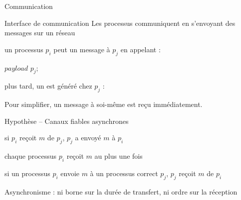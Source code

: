 
\begingroup

\begin{frame}{Communication}

  \vspace{-2mm}
  \begin{block}{Interface de communication}
    Les processus communiquent en s'envoyant des messages sur un réseau
    \begin{description}[Réception :]
      \item[Émission :]  un processus $p_i$ peut  un message à $p_j$ en appelant :
      \begin{algorithm}[H]
        \Send $\mathit{payload}$ \To $p_j$; 
      \end{algorithm}
      \item[Réception :] plus tard, un  est généré chez $p_j$ :
        \begin{algorithm}[H]
      \end{algorithm}
    \end{description}
    Pour simplifier, un message à soi-même est reçu immédiatement. 
  \end{block}
  
  \vspace{-2mm}
  \begin{block}{Hypothèse -- Canaux fiables asynchrones}
    \begin{description}[Réception :]
    \item[Validité :] si $p_i$ reçoit $m$ de $p_j$, $p_j$ a envoyé $m$ à $p_i$
    \item[Intégrité :] chaque processus $p_i$ reçoit $m$ au plus une fois
    \item[Fiabilité :] si un processus $p_i$ envoie $m$ à un processus correct $p_j$,
      $p_j$ reçoit $m$ de $p_i$
    \end{description}
    \alert{Asynchronisme :} ni borne sur la durée de transfert, ni ordre sur la réception
  \end{block}
  
\end{frame}

\endgroup
\endinput
